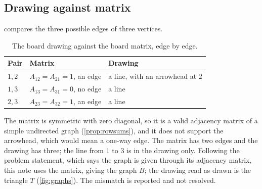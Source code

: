 \subsection{Drawing against matrix}\label{sec:drawingmatrix}

 compares the three possible edges of three vertices.

\begin{table}[ht]
\centering
\caption{The board drawing against the board matrix, edge by edge.}\label{tab:drawing}
\begin{tabular}{lll}
\toprule
Pair & Matrix & Drawing\\
\midrule
$1,2$ & $A_{12}=A_{21}=1$, an edge & a line, with an arrowhead at $2$\\
$1,3$ & $A_{13}=A_{31}=0$, no edge & a line\\
$2,3$ & $A_{23}=A_{32}=1$, an edge & a line\\
\bottomrule
\end{tabular}
\end{table}

The matrix is symmetric with zero diagonal, so it is a valid adjacency matrix of a simple undirected graph (\cref{prop:rowsums}), and it does not support the arrowhead, which would mean a one-way edge.
The matrix has two edges and the drawing has three; the line from $1$ to $3$ is in the drawing only.
Following the problem statement, which says the graph is given through its adjacency matrix, this note uses the matrix, giving the graph $B$; the drawing read as drawn is the triangle $T$ (\cref{fig:graphs}).
The mismatch is reported and not resolved.
